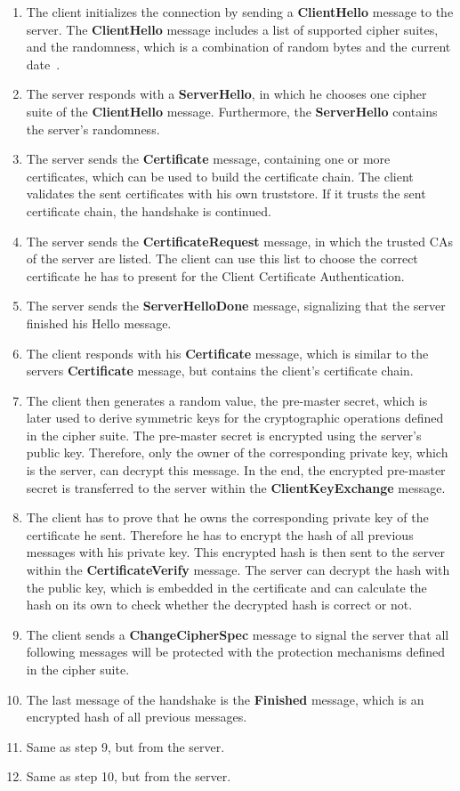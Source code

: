 \begin{enumerate}
	\item The client initializes the connection by sending a \textbf{ClientHello} message to the server.
		The \textbf{ClientHello} message includes a list of supported cipher suites, and the randomness, which is a combination of random bytes and the current date~\cite{mediumtls}.
	\item The server responds with a \textbf{ServerHello}, in which he chooses one cipher suite of the \textbf{ClientHello} message.
		Furthermore, the \textbf{ServerHello} contains the server's randomness.
	\item The server sends the \textbf{Certificate} message, containing one or more certificates, which can be used to build the certificate chain.
		The client validates the sent certificates with his own truststore.
		If it trusts the sent certificate chain, the handshake is continued.
	\item The server sends the \textbf{CertificateRequest} message, in which the trusted CAs of the server are listed.
		The client can use this list to choose the correct certificate he has to present for the Client Certificate Authentication.
	\item The server sends the \textbf{ServerHelloDone} message, signalizing that the server finished his Hello message.
	\item The client responds with his \textbf{Certificate} message, which is similar to the servers \textbf{Certificate} message, but contains the client's certificate chain.
	\item The client then generates a random value, the pre-master secret, which is later used to derive symmetric keys for the cryptographic operations defined in the cipher suite.
		The pre-master secret is encrypted using the server's public key.
		Therefore, only the owner of the corresponding private key, which is the server, can decrypt this message.
		In the end, the encrypted pre-master secret is transferred to the server within the \textbf{ClientKeyExchange} message.
	\item The client has to prove that he owns the corresponding private key of the certificate he sent.
		Therefore he has to encrypt the hash of all previous messages with his private key.
		This encrypted hash is then sent to the server within the \textbf{CertificateVerify} message.
		The server can decrypt the hash with the public key, which is embedded in the certificate and can calculate the hash on its own to check whether the decrypted hash is correct or not.
	\item The client sends a \textbf{ChangeCipherSpec} message to signal the server that all following messages will be protected with the protection mechanisms defined in the cipher suite.
	\item The last message of the handshake is the \textbf{Finished} message, which is an encrypted hash of all previous messages.
	\item Same as step 9, but from the server.
	\item Same as step 10, but from the server.
\end{enumerate}

